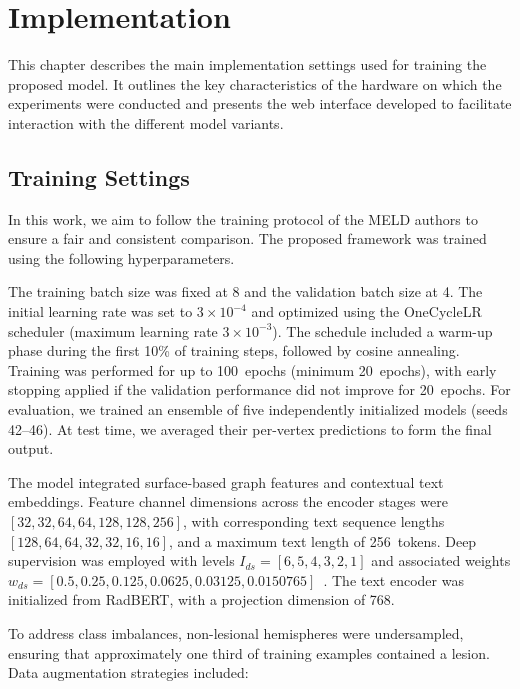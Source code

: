 \documentclass[FCD_GNN.tex]{subfiles}
\begin{document}
\chapter{Implementation}
\label{chapter:Implementation}

This chapter describes the main implementation settings used for training the
proposed model.
It outlines the key characteristics of the hardware on which the experiments
were conducted and presents the web interface developed to facilitate
interaction with the different model variants.


\section{Training Settings}
In this work, we aim to follow the training protocol of the MELD authors to
ensure a fair and consistent comparison.
The proposed framework was trained using the following hyperparameters.

The training batch size was fixed at 8 and the validation batch size at 4. 
The initial learning rate was set to $3 \times 10^{-4}$ and optimized using 
the OneCycleLR scheduler (maximum learning rate $3 \times 10^{-3}$). 
The schedule included a warm-up phase during the first 10\% of training steps, 
followed by cosine annealing. 
Training was performed for up to 100~epochs (minimum 20~epochs), 
with early stopping applied if the validation performance did not improve for 20~epochs.  
For evaluation, we trained an ensemble of five independently initialized models (seeds 42–46). 
At test time, we averaged their per-vertex predictions to form the final output.  

The model integrated surface-based graph features and contextual text embeddings. 
Feature channel dimensions across the encoder stages were
$[32,32,64,64,128,128,256]$, 
with corresponding text sequence lengths
$[128,64,64,32,32,16,16]$, 
and a maximum text length of 256~tokens. 
Deep supervision was employed with levels 
$I_{ds} = [6,5,4,3,2,1]$ 
and associated weights \\
$w_{ds} = [0.5, 0.25, 0.125, 0.0625, 0.03125, 0.0150765]$~\cite{Ripart2025MELD}. 
The text encoder was initialized from RadBERT, 
with a projection dimension of 768.  

To address class imbalances, non-lesional hemispheres were undersampled, 
ensuring that approximately one third of training examples contained a lesion. 
Data augmentation strategies included: 
\end{document}
